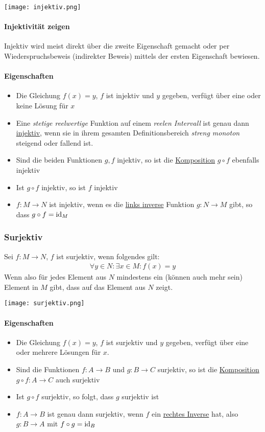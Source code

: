 \texttt{[image: injektiv.png]}

\paragraph{Injektivität zeigen}
Injektiv wird meist direkt über die zweite Eigenschaft gemacht oder per Wiederspruchsbeweis (indirekter Beweis) mittels der ersten Eigenschaft bewiesen.

\paragraph{Eigenschaften}
\begin{itemize}
	\item Die Gleichung $f(x) = y$, $f$ ist injektiv und $y$ gegeben, verfügt über eine oder keine Lösung für $x$
	\item Eine \textit{stetige reelwertige} Funktion auf einem \textit{reelen Intervall} ist genau dann \underline{injektiv}, wenn sie in ihrem gesamten Definitionsbereich \textit{streng monoton} steigend oder fallend ist.
	\item Sind die beiden Funktionen $g, f$ injektiv, so ist die \underline{Komposition} $g \circ f$ ebenfalls injektiv
	\item Ist $g \circ f$ injektiv, so ist $f$ injektiv
	\item $f: M \rightarrow N$ ist injektiv, wenn es die \underline{links inverse} Funktion $g: N \rightarrow M$ gibt, so dass $g \circ f = \operatorname{id}_M$
\end{itemize}

\subsubsection{Surjektiv}
Sei $f: M \rightarrow N$, $f$ ist surjektiv, wenn folgendes gilt:
\begin{align*}
\forall y \in N: \exists x \in M: f(x) = y
\end{align*}
Wenn also für jedes Element aus $N$ mindestens ein (können auch mehr sein) Element in $M$ gibt, dass auf das Element aus $N$ zeigt.

\texttt{[image: surjektiv.png]}

\paragraph{Eigenschaften}
\begin{itemize}
	\item Die Gleichung $f(x) = y$, $f$ ist surjektiv und $y$ gegeben, verfügt über eine oder mehrere Lösungen für $x$.
	\item Sind die Funktionen $f: A \rightarrow B$ und $g: B \rightarrow C$ surjektiv, so ist die \underline{Komposition} $g \circ f: A \rightarrow C$ auch surjektiv
	\item Ist $g \circ f$ surjektiv, so folgt, dass $g$ surjektiv ist
	\item $f: A \rightarrow B$ ist genau dann surjektiv, wenn $f$ ein \underline{rechtes Inverse} hat, also $g: B \rightarrow A$ mit $f \circ g = \operatorname{id}_B$
\end{itemize}

